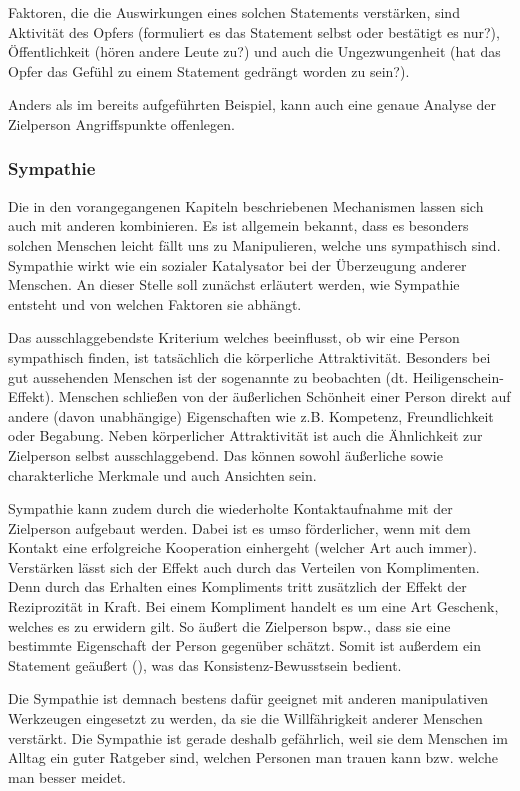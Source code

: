 Faktoren, die die Auswirkungen eines solchen Statements verstärken, sind Aktivität des Opfers (formuliert es das Statement selbst oder bestätigt es nur?), Öffentlichkeit (hören andere Leute zu?) und auch die Ungezwungenheit (hat das Opfer das Gefühl zu einem Statement gedrängt worden zu sein?). \cite{cialdini}

Anders als im bereits aufgeführten Beispiel, kann auch eine genaue Analyse der Zielperson Angriffspunkte offenlegen. %

\subsubsection{Sympathie}
Die in den vorangegangenen Kapiteln beschriebenen Mechanismen lassen sich auch mit anderen  kombinieren. Es ist allgemein bekannt, dass es besonders solchen Menschen leicht fällt uns zu Manipulieren, welche uns sympathisch sind.
Sympathie wirkt wie ein sozialer Katalysator bei der Überzeugung anderer Menschen. 
An dieser Stelle soll zunächst erläutert werden, wie Sympathie entsteht und von welchen Faktoren sie abhängt.

Das ausschlaggebendste Kriterium welches beeinflusst, ob wir eine Person sympathisch finden, ist tatsächlich die körperliche Attraktivität. Besonders bei gut aussehenden Menschen ist der sogenannte  zu beobachten (dt. Heiligenschein-Effekt). Menschen schließen von der äußerlichen Schönheit einer Person direkt auf andere (davon unabhängige) Eigenschaften wie z.B. Kompetenz, Freundlichkeit
oder Begabung.
Neben körperlicher Attraktivität ist auch die Ähnlichkeit zur Zielperson selbst ausschlaggebend. Das können sowohl äußerliche sowie charakterliche Merkmale und auch Ansichten sein.

Sympathie kann zudem durch die wiederholte Kontaktaufnahme mit der Zielperson aufgebaut werden. Dabei ist es umso förderlicher, wenn mit dem Kontakt eine erfolgreiche Kooperation einhergeht (welcher Art auch immer). Verstärken lässt sich der Effekt auch durch das Verteilen von Komplimenten. Denn durch das Erhalten eines Kompliments tritt zusätzlich der Effekt der Reziprozität in Kraft. Bei einem Kompliment handelt es um eine Art Geschenk, welches es zu erwidern gilt. So äußert die Zielperson bspw., dass sie eine bestimmte Eigenschaft der Person gegenüber schätzt. Somit ist außerdem ein Statement geäußert (), was das Konsistenz-Bewusstsein bedient.

Die Sympathie ist demnach bestens dafür geeignet mit anderen manipulativen Werkzeugen eingesetzt zu werden, da sie die Willfährigkeit anderer Menschen verstärkt. Die Sympathie ist gerade deshalb gefährlich, weil sie dem Menschen im Alltag ein guter Ratgeber sind, welchen Personen man trauen kann bzw. welche man besser meidet. \cite{cialdini}

